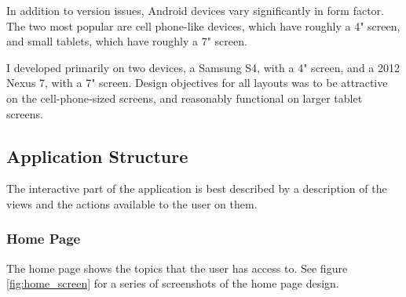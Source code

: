     In addition to version issues, Android devices vary significantly in form factor.
    The two most popular are cell phone-like devices, which have roughly a 4" screen,
    and small tablets, which have roughly a 7" screen.

    I developed primarily on two devices, a Samsung S4, with a 4" screen,
    and a 2012 Nexus 7, with a 7" screen.
    Design objectives for all layouts was to be attractive on the cell-phone-sized screens,
    and reasonably functional on larger tablet screens.

    \subsection{Application Structure}
    The interactive part of the application is best described by a description of the views
    and the actions available to the user on them.
      \subsubsection{Home Page}
      The home page shows the topics that the user has access to.
      See figure \ref{fig:home_screen} for a series of screenshots of the home page design.

